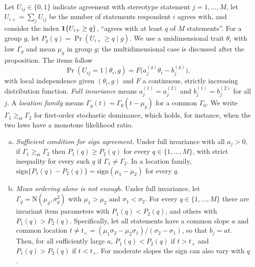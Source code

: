 Let $U_{ij}\in\{0,1\}$ indicate agreement with stereotype statement $j=1,\dots,M$, let $U_{i+}=\sum_jU_{ij}$ be the number of statements respondent $i$ agrees with, and consider the index $\mathbf{1}\!\left\{U_{i+}\ge q\right\}$, ``agrees with at least $q$ of $M$ statements''. For a group $g$, let $P_g(q)=\Pr(U_{i+}\ge q\mid g)$. We use a unidimensional trait $\theta_i$ with law $\Gamma_g$ and mean $\mu_g$ in group $g$; the multidimensional case is discussed after the proposition. The items follow
\begin{equation}\label{eq:sa-irf}
  \Pr(U_{ij}=1\mid\theta_i,g)=F\bigl(a_j^{(g)}\theta_i-b_j^{(g)}\bigr),
\end{equation}
with local independence given $(\theta_i,g)$ and $F$ a continuous, strictly increasing distribution function. \emph{Full invariance} means $a_j^{(1)}=a_j^{(2)}$ and $b_j^{(1)}=b_j^{(2)}$ for all $j$. A \emph{location family} means $\Gamma_g(t)=\Gamma_0(t-\mu_g)$ for a common $\Gamma_0$. We write $\Gamma_1\ge_{\mathrm{st}}\Gamma_2$ for first-order stochastic dominance, which holds, for instance, when the two laws have a monotone likelihood ratio.

\begin{proposition}\label{prop:index}
\begin{enumerate}[(a)]
  \item \emph{Sufficient condition for sign agreement.} Under full invariance with all $a_j>0$, if $\Gamma_1\ge_{\mathrm{st}}\Gamma_2$ then $P_1(q)\ge P_2(q)$ for every $q\in\{1,\dots,M\}$, with strict inequality for every such $q$ if $\Gamma_1\ne\Gamma_2$. In a location family, $\mathrm{sign}\{P_1(q)-P_2(q)\}=\mathrm{sign}(\mu_1-\mu_2)$ for every $q$.
  \item \emph{Mean ordering alone is not enough.} Under full invariance, let $\Gamma_g=\mathrm N(\mu_g,\sigma_g^2)$ with $\mu_1>\mu_2$ and $\sigma_1<\sigma_2$. For every $q\in\{1,\dots,M\}$ there are invariant item parameters with $P_1(q)<P_2(q)$, and others with $P_1(q)>P_2(q)$. Specifically, let all statements have a common slope $a$ and common location $t\ne t_\times=(\mu_1\sigma_2-\mu_2\sigma_1)/(\sigma_2-\sigma_1)$, so that $b_j=at$. Then, for all sufficiently large $a$, $P_1(q)<P_2(q)$ if $t>t_\times$ and $P_1(q)>P_2(q)$ if $t<t_\times$. For moderate slopes the sign can also vary with $q$.
\end{enumerate}
\end{proposition}

